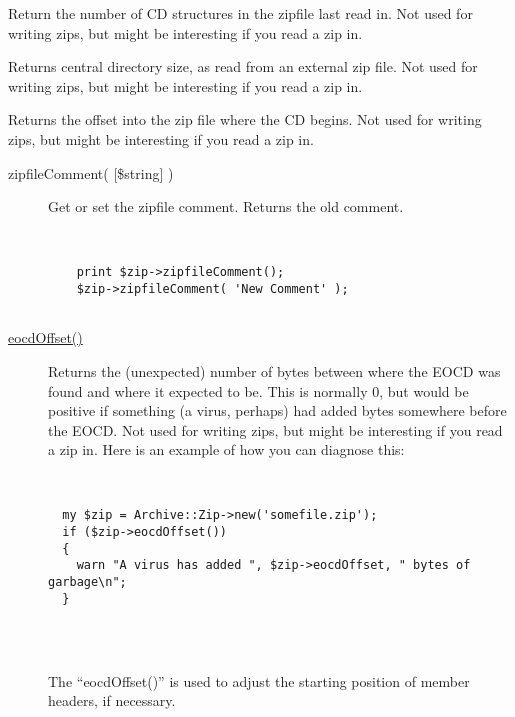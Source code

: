 \documentclass[]{article}
\renewcommand{\emph}[1]{\underline{#1}}
\begin{document}
\begin{description}
\itemsep1pt\parskip0pt
\item[\emph{numberOfCentralDirectories()}]
Return the number of CD structures in the zipfile last read in. Not used
for writing zips, but might be interesting if you read a zip in.
\end{description}

\begin{description}
\itemsep1pt\parskip0pt
\item[\emph{centralDirectorySize()}]
Returns central directory size, as read from an external zip file. Not
used for writing zips, but might be interesting if you read a zip in.
\end{description}

\begin{description}
\itemsep1pt\parskip0pt
\item[\emph{centralDirectoryOffsetWRTStartingDiskNumber()}]
Returns the offset into the zip file where the CD begins. Not used for
writing zips, but might be interesting if you read a zip in.
\end{description}

\begin{description}
\item[zipfileComment( {[}\$string{]} )]
Get or set the zipfile comment. Returns the old comment.

~

\begin{verbatim}
    print $zip->zipfileComment();
    $zip->zipfileComment( 'New Comment' );
    
\end{verbatim}
\end{description}

\begin{description}
\item[\emph{eocdOffset()}]
Returns the (unexpected) number of bytes between where the EOCD was
found and where it expected to be. This is normally 0, but would be
positive if something (a virus, perhaps) had added bytes somewhere
before the EOCD. Not used for writing zips, but might be interesting if
you read a zip in. Here is an example of how you can diagnose this:

~

\begin{verbatim}
  my $zip = Archive::Zip->new('somefile.zip');
  if ($zip->eocdOffset())
  {
    warn "A virus has added ", $zip->eocdOffset, " bytes of garbage\n";
  }
    
\end{verbatim}

~

The ``eocdOffset()'' is used to adjust the starting position of member
headers, if necessary.
\end{description}
\end{document}
